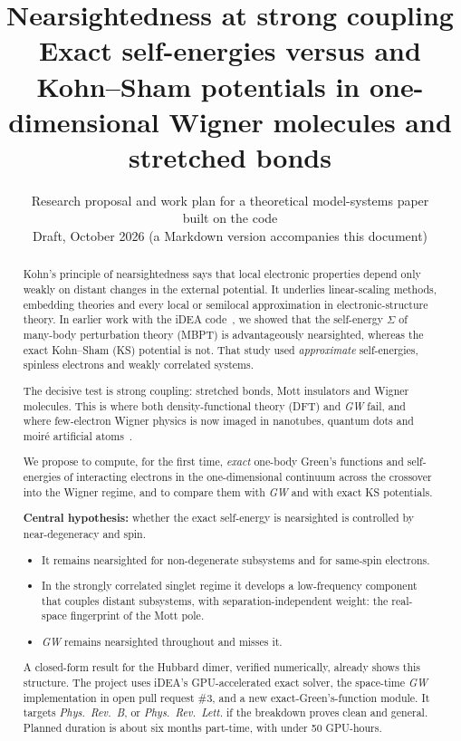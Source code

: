 \documentclass[11pt,a4paper]{article}
\title{\textbf{Nearsightedness at strong coupling}\\[4pt]
\large Exact self-energies versus \GW{} and Kohn--Sham potentials in one-dimensional Wigner molecules and stretched bonds}
\author{Research proposal and work plan for a theoretical model-systems paper\\ built on the \iDEA{} code\\[2pt]
\small Draft, October 2026 (a Markdown version accompanies this document)}
\date{}
\newcommand{\GW}{\textit{GW}}
\newcommand{\iDEA}{iDEA}
\begin{document}
\maketitle

\begin{abstract}
\noindent
Kohn's principle of nearsightedness says that local electronic properties depend only weakly on distant changes in the external potential. It underlies linear-scaling methods, embedding theories and every local or semilocal approximation in electronic-structure theory. In earlier work with the \iDEA{} code~\cite{wetherell2019}, we showed that the self-energy $\Sigma$ of many-body perturbation theory (MBPT) is advantageously nearsighted, whereas the exact Kohn--Sham (KS) potential is not. That study used \emph{approximate} self-energies, spinless electrons and weakly correlated systems.

The decisive test is strong coupling: stretched bonds, Mott insulators and Wigner molecules. This is where both density-functional theory (DFT) and \GW{} fail, and where few-electron Wigner physics is now imaged in nanotubes, quantum dots and moir\'e artificial atoms~\cite{pecker2013,shapir2019,corrigan2021,li2024}.

We propose to compute, for the first time, \emph{exact} one-body Green's functions and self-energies of interacting electrons in the one-dimensional continuum across the crossover into the Wigner regime, and to compare them with \GW{} and with exact KS potentials.

\textbf{Central hypothesis:} whether the exact self-energy is nearsighted is controlled by near-degeneracy and spin.
\begin{itemize}
\item It remains nearsighted for non-degenerate subsystems and for same-spin electrons.
\item In the strongly correlated singlet regime it develops a low-frequency component that couples distant subsystems, with separation-independent weight: the real-space fingerprint of the Mott pole.
\item \GW{} remains nearsighted throughout and misses it.
\end{itemize}

A closed-form result for the Hubbard dimer, verified numerically, already shows this structure. The project uses \iDEA's GPU-accelerated exact solver, the space-time \GW{} implementation in open pull request \#3, and a new exact-Green's-function module. It targets \emph{Phys.\ Rev.\ B}, or \emph{Phys.\ Rev.\ Lett.} if the breakdown proves clean and general. Planned duration is about six months part-time, with under 50 GPU-hours.
\end{abstract}
\end{document}

